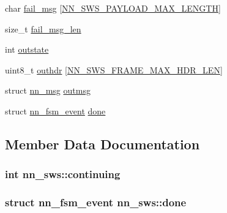 \begin{DoxyCompactItemize}
\item 
char \hyperlink{structnn__sws_a9d03e1694e61fd9b31098e445fcf9fd1}{fail\+\_\+msg} \mbox{[}\hyperlink{sws_8h_a54b93adb2e7c0b42654aeab3ba2771e5}{N\+N\+\_\+\+S\+W\+S\+\_\+\+P\+A\+Y\+L\+O\+A\+D\+\_\+\+M\+A\+X\+\_\+\+L\+E\+N\+G\+TH}\mbox{]}
\item 
size\+\_\+t \hyperlink{structnn__sws_abeb867a90a0a86a267ad8098f80a2328}{fail\+\_\+msg\+\_\+len}
\item 
int \hyperlink{structnn__sws_a4606806fb56f1d958da0cbe08c123b29}{outstate}
\item 
uint8\+\_\+t \hyperlink{structnn__sws_a223cc6cb203657b92932e646ea7c100a}{outhdr} \mbox{[}\hyperlink{sws_8h_a3f2d4522741ce9d1814c024af679c186}{N\+N\+\_\+\+S\+W\+S\+\_\+\+F\+R\+A\+M\+E\+\_\+\+M\+A\+X\+\_\+\+H\+D\+R\+\_\+\+L\+EN}\mbox{]}
\item 
struct \hyperlink{structnn__msg}{nn\+\_\+msg} \hyperlink{structnn__sws_add9846cfd06c9dc10abce6543337df46}{outmsg}
\item 
struct \hyperlink{structnn__fsm__event}{nn\+\_\+fsm\+\_\+event} \hyperlink{structnn__sws_a04798b6e4390e58c756ca488df1c81a6}{done}
\end{DoxyCompactItemize}


\subsection{Member Data Documentation}
\subsubsection[{continuing}]{\setlength{\rightskip}{0pt plus 5cm}int nn\+\_\+sws\+::continuing}\hypertarget{structnn__sws_a55f4dc293eaab3194dd58e18f458c3ea}{}\label{structnn__sws_a55f4dc293eaab3194dd58e18f458c3ea}
\subsubsection[{done}]{\setlength{\rightskip}{0pt plus 5cm}struct {\bf nn\+\_\+fsm\+\_\+event} nn\+\_\+sws\+::done}\hypertarget{structnn__sws_a04798b6e4390e58c756ca488df1c81a6}{}\label{structnn__sws_a04798b6e4390e58c756ca488df1c81a6}
